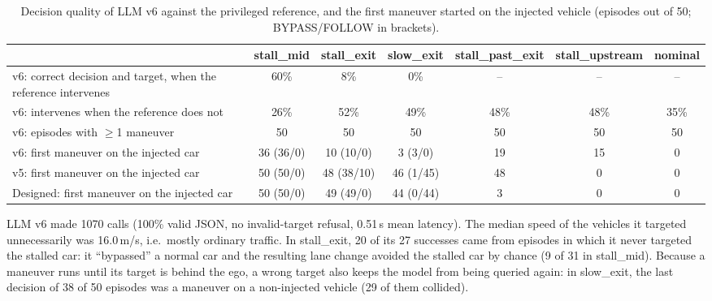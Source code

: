 \documentclass[11pt]{article}
\newenvironment{revblock}{\color{red}}{}
\begin{document}
\begin{revblock}
\begin{table}[h]
\centering\footnotesize
\caption{Decision quality of LLM v6 against the privileged reference, and the first maneuver started on the injected
vehicle (episodes out of 50; BYPASS/FOLLOW in brackets).}
\label{tab:dec}
\setlength{\tabcolsep}{4pt}
\begin{tabular}{>{\raggedright\arraybackslash}p{4.6cm}cccccc}
\toprule
 & stall\_mid & stall\_exit & slow\_exit & stall\_past\_exit & stall\_upstream & nominal \\
\midrule
v6: correct decision and target, when the reference intervenes & 60\% & 8\% & 0\% & -- & -- & -- \\
v6: intervenes when the reference does not & 26\% & 52\% & 49\% & 48\% & 48\% & 35\% \\
v6: episodes with $\geq$1 maneuver & 50 & 50 & 50 & 50 & 50 & 50 \\
v6: first maneuver on the injected car & 36 (36/0) & 10 (10/0) & 3 (3/0) & 19 & 15 & 0 \\
v5: first maneuver on the injected car & 50 (50/0) & 48 (38/10) & 46 (1/45) & 48 & 0 & 0 \\
Designed: first maneuver on the injected car & 50 (50/0) & 49 (49/0) & 44 (0/44) & 3 & 0 & 0 \\
\bottomrule
\end{tabular}
\end{table}

LLM v6 made 1070 calls (100\% valid JSON, no invalid-target refusal, 0.51\,s mean latency). The median speed of the
vehicles it targeted unnecessarily was 16.0\,m/s, i.e.\ mostly ordinary traffic. In stall\_exit, 20 of its 27 successes
came from episodes in which it never targeted the stalled car: it ``bypassed'' a normal car and the resulting lane change
avoided the stalled car by chance (9 of 31 in stall\_mid). Because a maneuver runs until its target is behind the ego,
a wrong target also keeps the model from being queried again: in slow\_exit, the last decision of 38 of 50 episodes was
a maneuver on a non-injected vehicle (29 of them collided).


\end{revblock}
\end{document}
